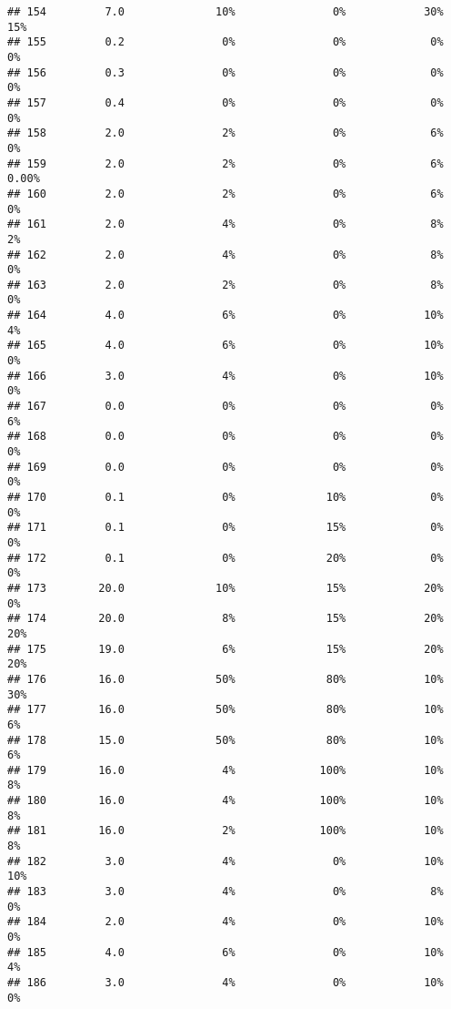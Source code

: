 \documentclass[
]{article}
\begin{document}
\begin{verbatim}
## 154         7.0              10%               0%            30%         15%
## 155         0.2               0%               0%             0%          0%
## 156         0.3               0%               0%             0%          0%
## 157         0.4               0%               0%             0%          0%
## 158         2.0               2%               0%             6%          0%
## 159         2.0               2%               0%             6%       0.00%
## 160         2.0               2%               0%             6%          0%
## 161         2.0               4%               0%             8%          2%
## 162         2.0               4%               0%             8%          0%
## 163         2.0               2%               0%             8%          0%
## 164         4.0               6%               0%            10%          4%
## 165         4.0               6%               0%            10%          0%
## 166         3.0               4%               0%            10%          0%
## 167         0.0               0%               0%             0%          6%
## 168         0.0               0%               0%             0%          0%
## 169         0.0               0%               0%             0%          0%
## 170         0.1               0%              10%             0%          0%
## 171         0.1               0%              15%             0%          0%
## 172         0.1               0%              20%             0%          0%
## 173        20.0              10%              15%            20%          0%
## 174        20.0               8%              15%            20%         20%
## 175        19.0               6%              15%            20%         20%
## 176        16.0              50%              80%            10%         30%
## 177        16.0              50%              80%            10%          6%
## 178        15.0              50%              80%            10%          6%
## 179        16.0               4%             100%            10%          8%
## 180        16.0               4%             100%            10%          8%
## 181        16.0               2%             100%            10%          8%
## 182         3.0               4%               0%            10%         10%
## 183         3.0               4%               0%             8%          0%
## 184         2.0               4%               0%            10%          0%
## 185         4.0               6%               0%            10%          4%
## 186         3.0               4%               0%            10%          0%

\end{verbatim}
\end{document}

